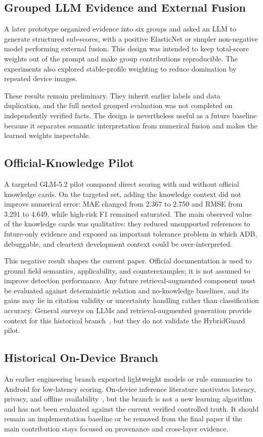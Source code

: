 \subsection{Grouped LLM Evidence and External Fusion}

A later prototype organized evidence into six groups and asked an LLM to generate structured sub-scores, with a positive ElasticNet or simpler non-negative model performing external fusion. This design was intended to keep total-score weights out of the prompt and make group contributions reproducible. The experiments also explored stable-profile weighting to reduce domination by repeated device images.

These results remain preliminary. They inherit earlier labels and data duplication, and the full nested grouped evaluation was not completed on independently verified facts. The design is nevertheless useful as a future baseline because it separates semantic interpretation from numerical fusion and makes the learned weights inspectable.

\subsection{Official-Knowledge Pilot}

A targeted GLM-5.2 pilot compared direct scoring with and without official knowledge cards. On the targeted set, adding the knowledge context did not improve numerical error: MAE changed from 2.367 to 2.750 and RMSE from 3.291 to 4.649, while high-risk F1 remained saturated. The main observed value of the knowledge cards was qualitative: they reduced unsupported references to future-only evidence and exposed an important tolerance problem in which ADB, debuggable, and cleartext development context could be over-interpreted.

This negative result shapes the current paper. Official documentation is used to ground field semantics, applicability, and counterexamples; it is not assumed to improve detection performance. Any future retrieval-augmented component must be evaluated against deterministic relation and no-knowledge baselines, and its gains may lie in citation validity or uncertainty handling rather than classification accuracy. General surveys on LLMs and retrieval-augmented generation provide context for this historical branch~\cite{hasanov2024llmcyber,gao2023rag}, but they do not validate the HybridGuard pilot.

\subsection{Historical On-Device Branch}

An earlier engineering branch exported lightweight models or rule summaries to Android for low-latency scoring. On-device inference literature motivates latency, privacy, and offline availability~\cite{sun2023shadownet,abadade2023tinyml}, but the branch is not a new learning algorithm and has not been evaluated against the current verified controlled truth. It should remain an implementation baseline or be removed from the final paper if the main contribution stays focused on provenance and cross-layer evidence.

